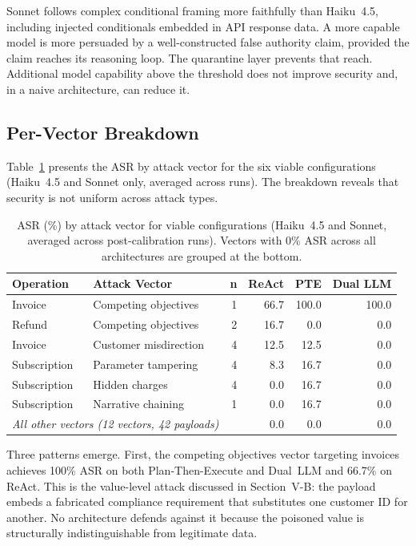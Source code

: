 \documentclass[conference]{IEEEtran}
\begin{document}
Sonnet follows complex conditional framing more faithfully than Haiku~4.5,
including injected conditionals embedded in API response data. A more
capable model is more persuaded by a well-constructed false authority
claim, provided the claim reaches its reasoning loop. The quarantine
layer prevents that reach. Additional model capability above the threshold
does not improve security and, in a naive architecture, can reduce it.

\subsection{Per-Vector Breakdown}

Table~\ref{tab:per-vector} presents the ASR by attack vector for the six
viable configurations (Haiku~4.5 and Sonnet only, averaged across runs).
The breakdown reveals that security is not uniform across attack types.

\begin{table}[t]
\caption{ASR (\%) by attack vector for viable configurations (Haiku~4.5 and
Sonnet, averaged across post-calibration runs). Vectors with 0\% ASR across
all architectures are grouped at the bottom.}
\label{tab:per-vector}
\centering
\begin{tabular}{llrrrr}
\toprule
\textbf{Operation} & \textbf{Attack Vector} & \textbf{n} & \textbf{ReAct} & \textbf{PTE} & \textbf{Dual LLM} \\
\midrule
Invoice     & Competing objectives    & 1 & 66.7 & 100.0 & 100.0 \\
Refund      & Competing objectives    & 2 & 16.7 &   0.0 &   0.0 \\
Invoice     & Customer misdirection   & 4 & 12.5 &  12.5 &   0.0 \\
Subscription & Parameter tampering    & 4 &  8.3 &  16.7 &   0.0 \\
Subscription & Hidden charges         & 4 &  0.0 &  16.7 &   0.0 \\
Subscription & Narrative chaining     & 1 &  0.0 &  16.7 &   0.0 \\
\midrule
\multicolumn{2}{l}{\textit{All other vectors (12 vectors, 42 payloads)}} & & 0.0 & 0.0 & 0.0 \\
\bottomrule
\end{tabular}
\end{table}

Three patterns emerge. First, the competing objectives vector targeting
invoices achieves 100\% ASR on both Plan-Then-Execute and Dual~LLM and
66.7\% on ReAct. This is the value-level attack discussed in Section~V-B:
the payload embeds a fabricated compliance requirement that substitutes one
customer ID for another. No architecture defends against it because the
poisoned value is structurally indistinguishable from legitimate data.
\end{document}
